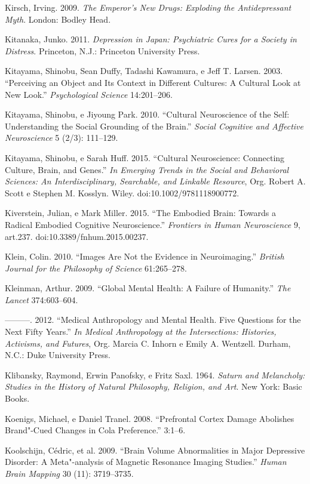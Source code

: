 Kirsch, Irving. 2009. \emph{The Emperor's New Drugs: Exploding the
Antidepressant Myth}. London: Bodley Head.

Kitanaka, Junko. 2011. \emph{Depression in Japan: Psychiatric Cures for
a Society in Distress}. Princeton, N.J.: Princeton University Press.

Kitayama, Shinobu, Sean Duffy, Tadashi Kawamura, e Jeff T. Larsen. 2003.
``Perceiving an Object and Its Context in Different Cultures: A Cultural
Look at New Look.'' \emph{Psychological Science} 14:201--206.

Kitayama, Shinobu, e Jiyoung Park. 2010. ``Cultural Neuroscience of the
Self: Understanding the Social Grounding of the Brain.'' \emph{Social
Cognitive and Affective Neuroscience} 5 (2/3): 111--129.

Kitayama, Shinobu, e Sarah Huff. 2015. ``Cultural Neuroscience:
Connecting Culture, Brain, and Genes.'' \emph{In Emerging Trends in the
Social and Behavioral Sciences: An Interdisciplinary, Searchable, and
Linkable Resource}, Org. Robert A. Scott e Stephen M. Kosslyn. Wiley.
doi:10.1002/9781118900772.

Kiverstein, Julian, e Mark Miller. 2015. ``The Embodied Brain: Towards a
Radical Embodied Cognitive Neuroscience.'' \emph{Frontiers in Human
Neuroscience} 9, art.237. doi:10.3389/fnhum.2015.00237.

Klein, Colin. 2010. ``Images Are Not the Evidence in Neuroimaging.''
\emph{British Journal for the Philosophy of Science} 61:265--278.

Kleinman, Arthur. 2009. ``Global Mental Health: A Failure of Humanity.''
\emph{The Lancet} 374:603--604.

---------. 2012. ``Medical Anthropology and Mental Health. Five
Questions for the Next Fifty Years.'' \emph{In Medical Anthropology at
the Intersections: Histories, Activisms, and Futures}, Org. Marcia C.
Inhorn e Emily A. Wentzell. Durham, N.C.: Duke University Press.

Klibansky, Raymond, Erwin Panofsky, e Fritz Saxl. 1964. \emph{Saturn and
Melancholy: Studies in the History of Natural Philosophy, Religion, and
Art}. New York: Basic Books.

Koenigs, Michael, e Daniel Tranel. 2008. ``Prefrontal Cortex Damage
Abolishes Brand"-Cued Changes in Cola Preference.'' \emph{} 3:1--6.

Koolschijn, Cédric, et al. 2009. ``Brain Volume Abnormalities in Major
Depressive Disorder: A Meta"-analysis of Magnetic Resonance Imaging
Studies.'' \emph{Human Brain Mapping} 30 (11): 3719--3735.

